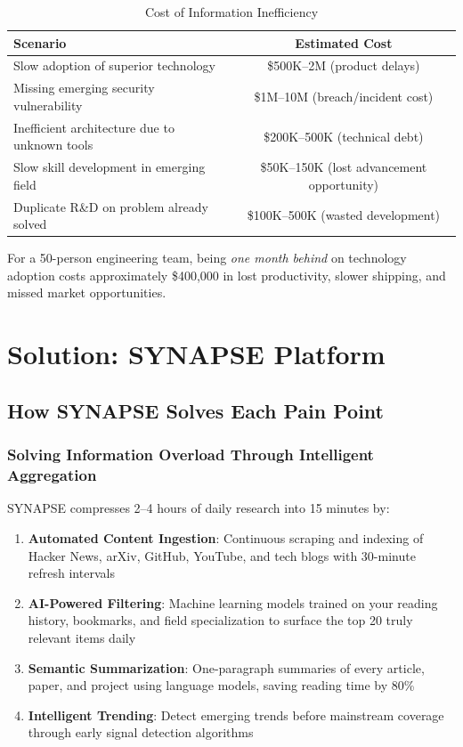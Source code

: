\documentclass{report}
\begin{document}
\begin{table}[h]
\centering
\begin{tabular}{|l|c|}
\toprule
\textbf{Scenario} & \textbf{Estimated Cost} \\
\midrule
Slow adoption of superior technology & \$500K--2M (product delays) \\
Missing emerging security vulnerability & \$1M--10M (breach/incident cost) \\
Inefficient architecture due to unknown tools & \$200K--500K (technical debt) \\
Slow skill development in emerging field & \$50K--150K (lost advancement opportunity) \\
Duplicate R\&D on problem already solved & \$100K--500K (wasted development) \\
\bottomrule
\end{tabular}
\caption{Cost of Information Inefficiency}
\end{table}

For a 50-person engineering team, being \textit{one month behind} on technology adoption costs approximately \$400,000 in lost productivity, slower shipping, and missed market opportunities.

\newpage

\chapter{Solution: SYNAPSE Platform}

\section{How SYNAPSE Solves Each Pain Point}

\subsection{Solving Information Overload Through Intelligent Aggregation}

SYNAPSE compresses 2--4 hours of daily research into 15 minutes by:

\begin{enumerate}
    \item \textbf{Automated Content Ingestion}: Continuous scraping and indexing of Hacker News, arXiv, GitHub, YouTube, and tech blogs with 30-minute refresh intervals
    \item \textbf{AI-Powered Filtering}: Machine learning models trained on your reading history, bookmarks, and field specialization to surface the top 20 truly relevant items daily
    \item \textbf{Semantic Summarization}: One-paragraph summaries of every article, paper, and project using language models, saving reading time by 80\%
    \item \textbf{Intelligent Trending}: Detect emerging trends before mainstream coverage through early signal detection algorithms
\end{enumerate}
\end{document}
